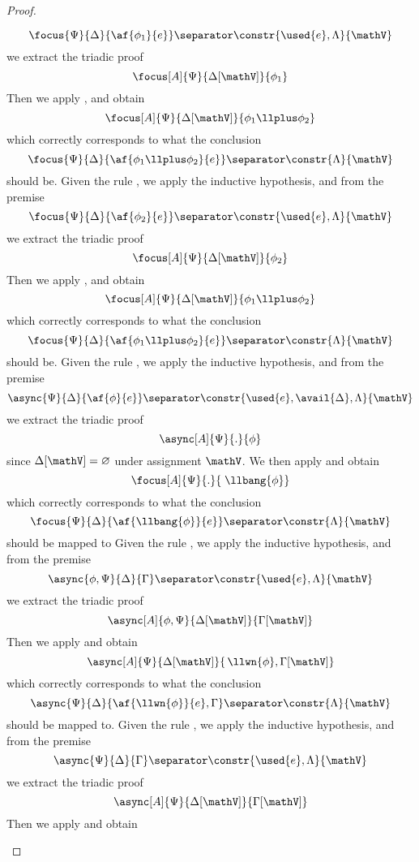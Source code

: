 \begin{proof}
\begin{itemize}
			$$ \focus{\Psi}{\Delta}{\af{\phi_1}{e}} \separator \constr{\used{e}, \Lambda}{\mathV}$$
			we extract the triadic proof
			$$ \focus[A]{\Psi}{\Delta[\mathV]}{\phi_1} $$
			Then we apply \derRule[A]{\displayplus[L]}, and obtain
			$$ \focus[A]{\Psi}{\Delta[\mathV]}{\phi_1 \llplus \phi_2} $$
			which correctly corresponds to what the conclusion
			$$ \focus{\Psi}{\Delta}{\af{\phi_1 \llplus \phi_2}{e}} \separator \constr{\Lambda}{\mathV} $$
			should be.
		\indCase{\displayplus[R]} Given the rule \derRule{\displayplus[R]}, we apply the inductive hypothesis, and from the premise
			$$ \focus{\Psi}{\Delta}{\af{\phi_2}{e}} \separator \constr{\used{e}, \Lambda}{\mathV}$$
			we extract the triadic proof
			$$ \focus[A]{\Psi}{\Delta[\mathV]}{\phi_2} $$
			Then we apply \derRule[A]{\displayplus[R]}, and obtain
			$$ \focus[A]{\Psi}{\Delta[\mathV]}{\phi_1 \llplus \phi_2} $$
			which correctly corresponds to what the conclusion
			$$ \focus{\Psi}{\Delta}{\af{\phi_1 \llplus \phi_2}{e}} \separator \constr{\Lambda}{\mathV} $$
			should be.
		\indCase{\displaybang} Given the rule \derRule{\displaybang}, we apply the inductive hypothesis, and from the premise
			$$ \async{\Psi}{\Delta}{\af{\phi}{e}} \separator \constr{\used{e}, \avail{\Delta}, \Lambda}{\mathV} $$
			we extract the triadic proof
			$$ \async[A]{\Psi}{.}{\phi} $$
			since $\Delta[\mathV] = \varnothing$ under assignment $\mathV$.
			We then apply \derRule[A]{\displaybang} and obtain
			$$ \focus[A]{\Psi}{.}{\;\llbang{\phi}} $$
			which correctly corresponds to what the conclusion 
			$$ \focus{\Psi}{\Delta}{\af{\llbang{\phi}}{e}} \separator \constr{\Lambda}{\mathV} $$
			should be mapped to
		\indCase{\displaywn} Given the rule \derRule{\displaywn}, we apply the inductive hypothesis, and from the premise
			$$ \async{\phi, \Psi}{\Delta}{\Gamma} \separator \constr{\used{e}, \Lambda}{\mathV} $$
			we extract the triadic proof
			$$ \async[A]{\phi, \Psi}{\Delta[\mathV]}{\Gamma[\mathV]}$$
			Then we apply \derRule[A]{\displaywn} and obtain
			$$ \async[A]{\Psi}{\Delta[\mathV]}{\,\llwn{\phi}, \Gamma[\mathV]} $$
			which correctly corresponds to what the conclusion
			$$ \async{\Psi}{\Delta}{\af{\llwn{\phi}}{e}, \Gamma} \separator \constr{\Lambda}{\mathV} $$
			should be mapped to.
		\indCase{\displaybot} Given the rule \derRule{\displaybot}, we apply the inductive hypothesis, and from the premise
			$$ \async{\Psi}{\Delta}{\Gamma} \separator \constr{\used{e}, \Lambda}{\mathV} $$
			we extract the triadic proof
			$$ \async[A]{\Psi}{\Delta[\mathV]}{\Gamma[\mathV]} $$
			Then we apply \derRule[A]{\displaybot} and obtain

\end{itemize}
\end{proof}
